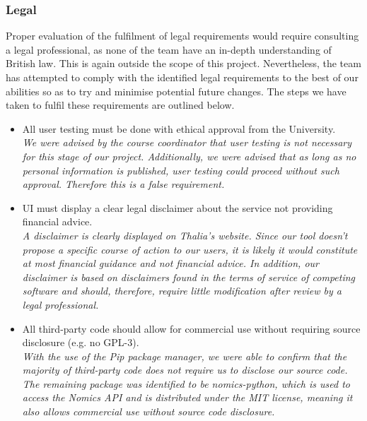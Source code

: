 \documentclass[main.tex]{subfiles}
\begin{document}
\subsubsection{Legal}
Proper evaluation of the fulfilment of legal requirements would require consulting a legal professional, as none of the team have an in-depth understanding of British law. This is again outside the scope of this project. Nevertheless, the team has attempted to comply with the identified legal requirements to the best of our abilities so as to try and minimise potential future changes. The steps we have taken to fulfil these requirements are outlined below. 

\begin{itemize}

\item All user testing must be done with ethical approval from the University.\\
\textit{We were advised by the course coordinator that user testing is not necessary for this stage of our project. Additionally, we were advised that as long as no personal information is published, user testing could proceed without such approval. Therefore this is a false requirement.}

\item UI must display a clear legal disclaimer about the service not providing financial advice.\\
\textit{A disclaimer is clearly displayed on Thalia’s website. Since our tool doesn't propose a specific course of action to our users, it is likely it would constitute at most financial guidance and not financial advice\cite{FinAdvice}. In addition, our disclaimer is based on disclaimers found in the terms of service of competing software \cite{portfolioVisualizerToS} and should, therefore, require little modification after review by a legal professional.}

\item All third-party code should allow for commercial use without requiring source disclosure (e.g. no GPL-3).\\
\textit{With the use of the Pip package manager, we were able to confirm that the majority of third-party code does not require us to disclose our source code. The remaining package was identified to be nomics-python, which is used to access the Nomics API and is distributed under the MIT license, meaning it also allows commercial use without source code disclosure.}




\end{itemize}
\end{document}
